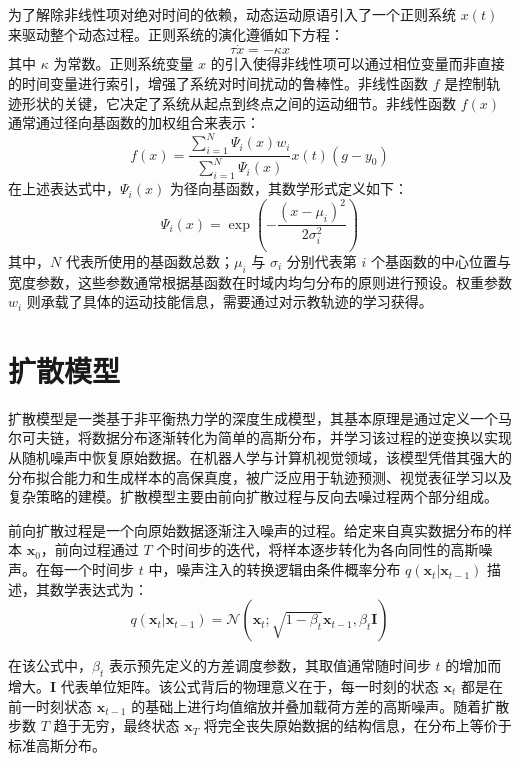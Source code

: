 为了解除非线性项对绝对时间的依赖，动态运动原语引入了一个正则系统 $x(t)$ 来驱动整个动态过程。正则系统的演化遵循如下方程：
\begin{equation}
\tau \dot{x} = - \kappa x
\end{equation}
其中 $\kappa$ 为常数。正则系统变量 $x$ 的引入使得非线性项可以通过相位变量而非直接的时间变量进行索引，增强了系统对时间扰动的鲁棒性。非线性函数 $f$ 是控制轨迹形状的关键，它决定了系统从起点到终点之间的运动细节。非线性函数 $f(x)$ 通常通过径向基函数的加权组合来表示：
\begin{equation}
f(x) = \frac{\sum_{i=1}^{N} \Psi_{i}(x) w_{i}}{\sum_{i=1}^{N} \Psi_{i}(x)} x(t) ( g - y_{0} )
\end{equation}
在上述表达式中，$\Psi_{i}(x)$ 为径向基函数，其数学形式定义如下：
\begin{equation}
\Psi_{i}(x) = \exp ( - \frac{(x - \mu_{i})^{2}}{2 \sigma_{i}^{2}} )
\end{equation}
其中，$N$ 代表所使用的基函数总数；$\mu_{i}$ 与 $\sigma_{i}$ 分别代表第 $i$ 个基函数的中心位置与宽度参数，这些参数通常根据基函数在时域内均匀分布的原则进行预设。权重参数 $w_{i}$ 则承载了具体的运动技能信息，需要通过对示教轨迹的学习获得。

\section{扩散模型}

扩散模型\cite{ho2020denoising,song2020denoising,song2020score,karras2022elucidating}是一类基于非平衡热力学的深度生成模型，其基本原理是通过定义一个马尔可夫链，将数据分布逐渐转化为简单的高斯分布，并学习该过程的逆变换以实现从随机噪声中恢复原始数据。在机器人学与计算机视觉领域，该模型凭借其强大的分布拟合能力和生成样本的高保真度，被广泛应用于轨迹预测、视觉表征学习以及复杂策略的建模。扩散模型主要由前向扩散过程与反向去噪过程两个部分组成。

前向扩散过程是一个向原始数据逐渐注入噪声的过程。给定来自真实数据分布的样本 $\mathbf{x}_0$，前向过程通过 $T$ 个时间步的迭代，将样本逐步转化为各向同性的高斯噪声。在每一个时间步 $t$ 中，噪声注入的转换逻辑由条件概率分布 $q(\mathbf{x}_t | \mathbf{x}_{t-1})$ 描述，其数学表达式为：
\begin{equation}
q(\mathbf{x}_t | \mathbf{x}_{t-1}) = \mathcal{N}(\mathbf{x}_t; \sqrt{1 - \beta_t} \mathbf{x}_{t-1}, \beta_t \mathbf{I})
\end{equation}

在该公式中，$\beta_t$ 表示预先定义的方差调度参数，其取值通常随时间步 $t$ 的增加而增大。$\mathbf{I}$ 代表单位矩阵。该公式背后的物理意义在于，每一时刻的状态 $\mathbf{x}_t$ 都是在前一时刻状态 $\mathbf{x}_{t-1}$ 的基础上进行均值缩放并叠加载荷方差的高斯噪声。随着扩散步数 $T$ 趋于无穷，最终状态 $\mathbf{x}_T$ 将完全丧失原始数据的结构信息，在分布上等价于标准高斯分布。

